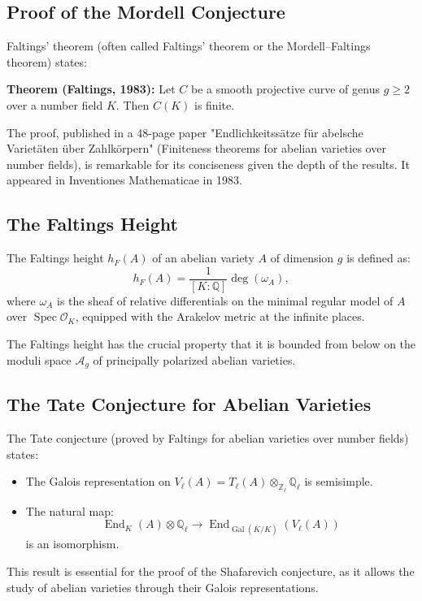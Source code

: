 \subsection{Proof of the Mordell Conjecture}

Faltings' theorem (often called Faltings' theorem or the Mordell--Faltings theorem) states:

\textbf{Theorem (Faltings, 1983):} Let $C$ be a smooth projective curve of genus $g \geq 2$ over a number field $K$. Then $C(K)$ is finite.

The proof, published in a 48-page paper "Endlichkeitss\"atze f\"ur abelsche Variet\"aten \"uber Zahlk\"orpern" (Finiteness theorems for abelian varieties over number fields), is remarkable for its conciseness given the depth of the results. It appeared in Inventiones Mathematicae in 1983.

\subsection{The Faltings Height}

The Faltings height $h_F(A)$ of an abelian variety $A$ of dimension $g$ is defined as:
\[
h_F(A) = \frac{1}{[K:\mathbb{Q}]} \deg(\omega_A),
\]
where $\omega_A$ is the sheaf of relative differentials on the minimal regular model of $A$ over $\operatorname{Spec} \mathcal{O}_K$, equipped with the Arakelov metric at the infinite places.

The Faltings height has the crucial property that it is bounded from below on the moduli space $\mathcal{A}_g$ of principally polarized abelian varieties.

\subsection{The Tate Conjecture for Abelian Varieties}

The Tate conjecture (proved by Faltings for abelian varieties over number fields) states:
\begin{itemize}
\item The Galois representation on $V_\ell(A) = T_\ell(A) \otimes_{\mathbb{Z}_\ell} \mathbb{Q}_\ell$ is semisimple.
\item The natural map:
\[
\operatorname{End}_K(A) \otimes \mathbb{Q}_\ell \to \operatorname{End}_{\operatorname{Gal}(\overline{K}/K)}(V_\ell(A))
\]
is an isomorphism.
\end{itemize}

This result is essential for the proof of the Shafarevich conjecture, as it allows the study of abelian varieties through their Galois representations.

